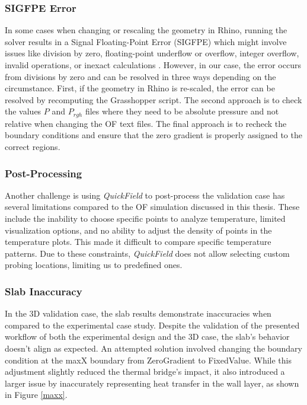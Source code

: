 \subsubsection{SIGFPE Error}
In some cases when changing or rescaling the geometry in Rhino, running the solver results in a Signal Floating-Point Error (SIGFPE) which might involve issues like division by zero, floating-point underflow or overflow, integer overflow, invalid operations, or inexact calculations \cite{sigfpe}. However, in our case, the error occurs from divisions by zero and can be resolved in three ways depending on the circumstance. First, if the geometry in Rhino is re-scaled, the error can be resolved by recomputing the Grasshopper script. The second approach is to check the values $P$ and $P_{rgh}$ files where they need to be absolute pressure and not relative when changing the \gls{OF} text files. The final approach is to recheck the boundary conditions and ensure that the zero gradient is properly assigned to the correct regions.

\subsubsection{Post-Processing}
Another challenge is using \textit{QuickField} to post-process the validation case has several limitations compared to the \gls{OF} simulation discussed in this thesis. These include the inability to choose specific points to analyze temperature, limited visualization options, and no ability to adjust the density of points in the temperature plots. This made it difficult to compare specific temperature patterns.
Due to these constraints, \textit{QuickField} does not allow selecting custom probing locations, limiting us to predefined ones.

\subsubsection{Slab Inaccuracy}
In the 3D validation case, the slab results demonstrate inaccuracies when compared to the experimental case study. Despite the validation of the presented workflow of both the experimental design and the 3D case, the slab's behavior doesn't align as expected. An attempted solution involved changing the boundary condition at the maxX boundary from ZeroGradient to FixedValue.
While this adjustment slightly reduced the thermal bridge's impact, it also introduced a larger issue by inaccurately representing heat transfer in the wall layer, as shown in Figure \ref{maxx}.

